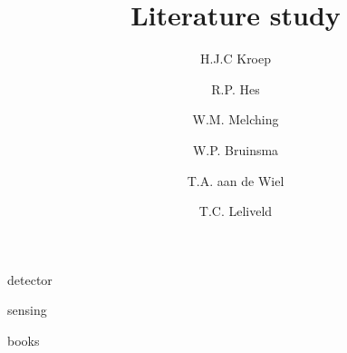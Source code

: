\documentclass[report]{memoir}
\title{Literature study}
\author{H.J.C Kroep \and R.P. Hes \and W.M. Melching \and W.P. Bruinsma \and T.A. aan de Wiel \and T.C. Leliveld}
\begin{document}
\maketitle
\clearpage

\frontmatter
\tableofcontents

\mainmatter
{detector}

{sensing}

{books}

\printbibliography

\appendix
\end{document}
